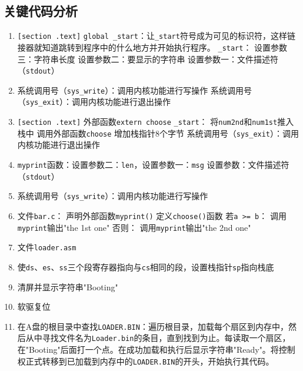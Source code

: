 \subsection{关键代码分析}
\begin{enumerate}
    \item \texttt{[section .text]}
    \texttt{global \_start}：让\texttt{\_start}符号成为可见的标识符，这样链接器就知道跳转到程序中的什么地方并开始执行程序。
    \texttt{\_start}：
    设置参数三：字符串长度
    设置参数二：要显示的字符串
    设置参数一：文件描述符（\texttt{stdout}）

    \item 系统调用号（\texttt{sys\_write}）：调用内核功能进行写操作
    系统调用号（\texttt{sys\_exit}）：调用内核功能进行退出操作
    
    \item \texttt{[section .text]}
    外部函数\texttt{extern choose}
    \texttt{\_start}：
    将\texttt{num2nd}和\texttt{num1st}推入栈中
    调用外部函数\texttt{choose}
    增加栈指针8个字节
    系统调用号（\texttt{sys\_exit}）：调用内核功能进行退出操作

    \item \texttt{myprint}函数：设置参数二：\texttt{len}，设置参数一：\texttt{msg}
    设置参数：文件描述符（\texttt{stdout}）
    
    \item 系统调用号（\texttt{sys\_write}）：调用内核功能进行写操作

    \item 文件\texttt{bar.c}：
    声明外部函数\texttt{myprint()}
    定义\texttt{choose()}函数
    若\texttt{a >= b}：
    调用\texttt{myprint}输出"the 1st one"
    否则：
    调用\texttt{myprint}输出"the 2nd one"
    
    \item 文件\texttt{loader.asm}
    
    \item 使\texttt{ds}、\texttt{es}、\texttt{ss}三个段寄存器指向与\texttt{cs}相同的段，设置栈指针\texttt{sp}指向栈底

    \item 清屏并显示字符串"Booting"

    \item 软驱复位

    \item 在A盘的根目录中查找\texttt{LOADER.BIN}：遍历根目录，加载每个扇区到内存中，然后从中寻找文件名为\texttt{Loader.bin}的条目，直到找到为止。每读取一个扇区，在"Booting"后面打一个点。在成功加载和执行后显示字符串"Ready"。将控制权正式转移到已加载到内存中的\texttt{LOADER.BIN}的开头，开始执行其代码。


\end{enumerate}
